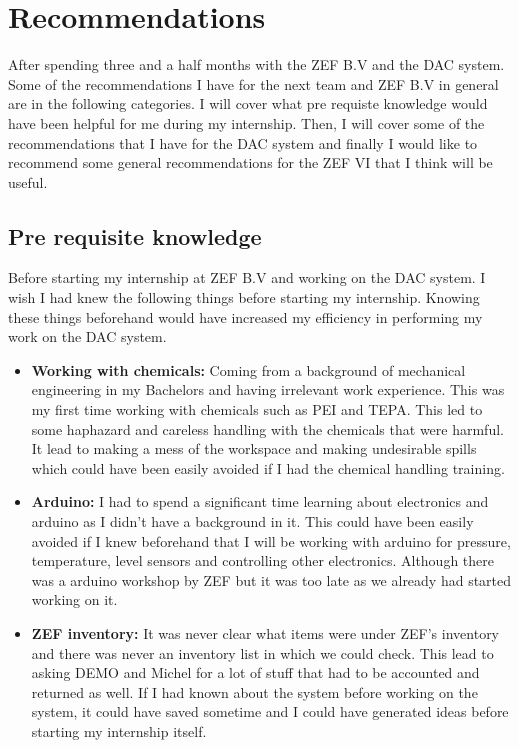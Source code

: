 \section{Recommendations}
\label{sec:recom}

After spending three and a half months with the ZEF B.V and the DAC system. Some of the recommendations I have for the next team and ZEF B.V in general are in the following categories. I will cover what pre requiste knowledge would have been helpful for me during my internship. Then, I will cover some of the recommendations that I have for the DAC system and finally I would like to recommend some general recommendations for the ZEF VI that I think will be useful. 

\subsection{Pre requisite knowledge}

Before starting my internship at ZEF B.V and working on the DAC system. I wish I had knew the following things before starting my internship. Knowing these things beforehand would have increased my efficiency in performing my work on the DAC system. 

\begin{itemize}
    \item \textbf{Working with chemicals: }Coming from a background of mechanical engineering in my Bachelors and having irrelevant work experience. This was my first time working with chemicals such as PEI and TEPA. This led to some haphazard and careless handling with the chemicals that were harmful. It lead to making a mess of the workspace and making undesirable spills which could have been easily avoided if I had the chemical handling training. 
    
    \item \textbf{Arduino: }I had to spend a significant time learning about electronics and arduino as I didn't have a background in it. This could have been easily avoided if I knew beforehand that I will be working with arduino for pressure, temperature, level sensors and controlling other electronics. Although there was a arduino workshop by ZEF but it was too late as we already had started working on it. 
    
    \item \textbf{ZEF inventory: }It was never clear what items were under ZEF's inventory and there was never an inventory list in which we could check. This lead to asking DEMO and Michel for a lot of stuff that had to be accounted and returned as well. If I had known about the system before working on the system, it could have saved sometime and I could have generated ideas before starting my internship itself. 
\end{itemize}

